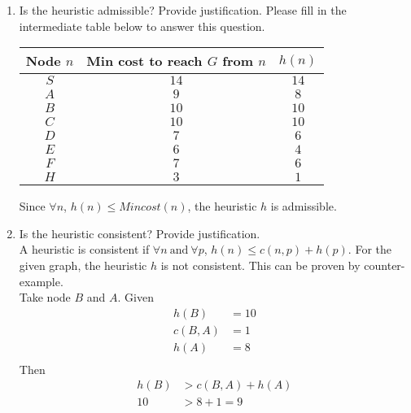 \begin{enumerate}
  \item Is the heuristic admissible? Provide justification. Please fill in the intermediate table below to answer this question.
        \begin{center}
          \bgroup
          \def\arraystretch{1.5}%
          \begin{tabular}{|c|c|c|}
            \hline
            Node $n$ & Min cost to reach $G$ from $n$ & $h(n)$ \\
            \hline
            $S$      & $14$                           & $14$   \\
            $A$      & $9$                            & $8$    \\
            $B$      & $10$                           & $10$   \\
            $C$      & $10$                           & $10$   \\
            $D$      & $7$                            & $6$    \\
            $E$      & $6$                            & $4$    \\
            $F$      & $7$                            & $6$    \\
            $H$      & $3$                            & $1$    \\
            \hline
          \end{tabular}
          \egroup
        \end{center}
        Since $\forall n$, $h(n)\le Mincost(n)$, the heuristic $h$ is admissible.
  \item Is the heuristic consistent? Provide justification.\\[10pt]
        A heuristic is consistent if $\forall n \ \text{and}\  \forall p$, $h(n) \le c(n,p) + h(p)$. For the given graph, the heuristic $h$ is not consistent. This can be proven by counter-example.\\
        Take node $B$ and $A$. Given
        \begin{align*}
          h(B)   & = 10 \\
          c(B,A) & = 1  \\
          h(A)   & = 8  \\
        \end{align*}
        Then
        \begin{align*}
          h(B) & > c(B,A) + h(A) \\
          10   & > 8 + 1 = 9     \\

\end{align*}
\end{enumerate}
